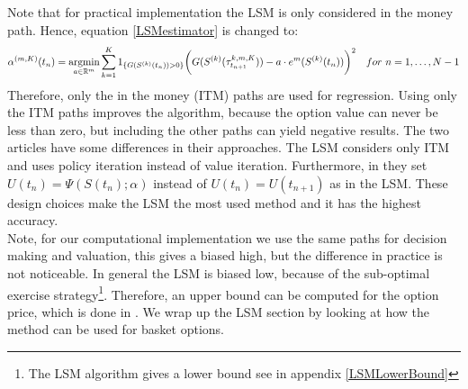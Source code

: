 Note that for practical implementation the LSM is only considered in the money path. Hence, equation \eqref{LSMestimator} is changed to:
\begin{equation*}
\alpha^{(m,K)}(t_n)= \operatorname*{argmin}_{a\in \mathbb{R}^m} \sum_{k=1}^{K} 1_{\{G(S^{(k)}(t_n))>0\}} \bigg(G(S^{(k)}(\tau^{k,m,K}_{t_{n+1}}))  -a \cdot e^m(S^{(k)}(t_{n})) \bigg)^2 \quad for \ n=1, \ldots, N-1
\end{equation*}
Therefore, only the in the money (ITM) paths are used for regression. Using only the ITM paths improves the algorithm, because the option value can never be less than zero, but including the other paths can yield negative results. The two articles \parencite{LSM, Tsitsiklis} have some differences in their approaches. The LSM considers only ITM and uses policy iteration instead of value iteration. Furthermore, in \parencite{Tsitsiklis} they set $U(t_n)= \Psi(S(t_n); \alpha)$ instead of $U(t_n)= U(t_{n+1})$ as in the LSM. These design choices make the LSM the most used method and it has the highest accuracy.\\

Note, for our computational implementation we use the same paths for decision making and valuation, this gives a biased high, but the difference in practice is not noticeable. In general the LSM is biased low, because of the sub-optimal exercise strategy\footnote{The LSM algorithm gives a lower bound see in appendix \ref{LSMLowerBound}}. Therefore, an upper bound can be computed for the option price, which is done in \parencite{AndersenLeif2004}. We wrap up the LSM section by looking at how the method can be used for basket options.

